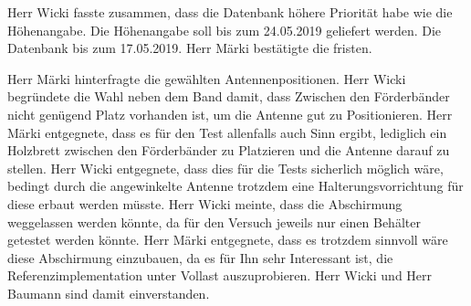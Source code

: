 \documentclass[parskip=full, a4paper]{scrreprt}
\begin{document}
Herr Wicki fasste zusammen, dass die Datenbank höhere Priorität habe wie die Höhenangabe. Die Höhenangabe soll bis zum 24.05.2019 geliefert werden. Die Datenbank bis zum 17.05.2019. Herr Märki bestätigte die fristen.

Herr Märki hinterfragte die gewählten Antennenpositionen. Herr Wicki begründete die Wahl neben dem Band damit, dass Zwischen den Förderbänder nicht genügend Platz vorhanden ist, um die Antenne gut zu Positionieren. Herr Märki entgegnete, dass es für den Test allenfalls auch Sinn ergibt, lediglich ein Holzbrett zwischen den Förderbänder zu Platzieren und die Antenne darauf zu stellen. Herr Wicki entgegnete, dass dies für die Tests sicherlich möglich wäre, bedingt durch die angewinkelte Antenne trotzdem eine Halterungsvorrichtung für diese erbaut werden müsste. Herr Wicki meinte, dass die Abschirmung weggelassen werden könnte, da für den Versuch jeweils nur einen Behälter getestet werden könnte. Herr Märki entgegnete, dass es trotzdem sinnvoll wäre diese Abschirmung einzubauen, da es für Ihn sehr Interessant ist, die Referenzimplementation unter Vollast auszuprobieren. Herr Wicki und Herr Baumann sind damit einverstanden.
\end{document}
